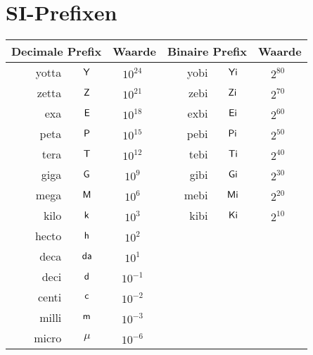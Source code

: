 \section{SI-Prefixen}
\label{sec:SIPrefixen}


\begin{center}
\begin{tabular}{|r|c|c||r|c|c|}
\hline
\multicolumn{ 2}{|c|}{{\bf Decimale Prefix}} & {\bf Waarde} & \multicolumn{ 2}{|c|}{{\bf Binaire Prefix}} & {\bf Waarde} \\
\hline
\hline
     yotta & $\,\textsf{Y}\,$ & $10^{24^{\phantom n}}$ &       yobi & $\,\textsf{Yi}\,$ &  $2^{80^{\phantom n}}$ \\
\hline
     zetta & $\,\textsf{Z}\,$ & $10^{21^{\phantom n}}$ &       zebi & $\,\textsf{Zi}\,$ &  $2^{70^{\phantom n}}$ \\
\hline
       exa & $\,\textsf{E}\,$ & $10^{18^{\phantom n}}$ &       exbi & $\,\textsf{Ei}\,$ &  $2^{60^{\phantom n}}$ \\
\hline
      peta & $\,\textsf{P}\,$ & $10^{15^{\phantom n}}$ &       pebi & $\,\textsf{Pi}\,$ &  $2^{50^{\phantom n}}$ \\
\hline
      tera & $\,\textsf{T}\,$ & $10^{12^{\phantom n}}$ &       tebi & $\,\textsf{Ti}\,$ &  $2^{40^{\phantom n}}$ \\
\hline
      giga & $\,\textsf{G}\,$ &  $10^{9^{\phantom n}}$ &       gibi & $\,\textsf{Gi}\,$ &  $2^{30^{\phantom n}}$ \\
\hline
      mega & $\,\textsf{M}\,$ &  $10^{6^{\phantom n}}$ &       mebi & $\,\textsf{Mi}\,$ &  $2^{20^{\phantom n}}$ \\
\hline
      kilo & $\,\textsf{k}\,$ &  $10^{3^{\phantom n}}$ &       kibi & $\,\textsf{Ki}\,$ &  $2^{10^{\phantom n}}$ \\
\hline
     hecto & $\,\textsf{h}\,$ &  $10^{2^{\phantom n}}$ &            &            &            \\
\hline
      deca & $\,\textsf{da}\,$ &  $10^{1^{\phantom n}}$ &            &            &            \\
\hline
\hline
      deci & $\,\textsf{d}\,$ & $10^{-1^{\phantom n}}$ &            &            &            \\
\hline
     centi & $\,\textsf{c}\,$ & $10^{-2^{\phantom n}}$ &            &            &            \\
\hline
     milli & $\,\textsf{m}\,$ & $10^{-3^{\phantom n}}$ &            &            &            \\
\hline
     micro & $\mu$ & $10^{-6^{\phantom n}}$ &                 &            &            \\

\end{tabular}
\end{center}
